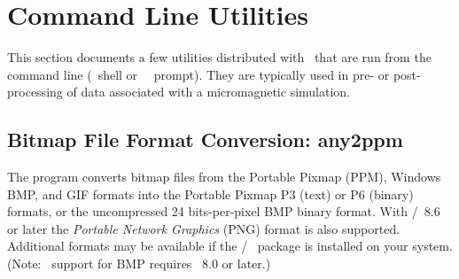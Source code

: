 \section{Command Line Utilities}\label{sec:cmdutils}

This section documents a few utilities distributed with \OOMMF\ that are
run from the command line (\Unix\ shell or \Windows\ \DOS\ prompt).
They are typically used in pre- or post-processing of data associated
with a micromagnetic simulation.


\subsection{Bitmap File Format Conversion:
          any2ppm}\label{sec:any2ppm}%
%
The  program converts bitmap files from the Portable Pixmap
(PPM), Windows BMP, and GIF formats into the Portable Pixmap P3
(text) or P6 (binary) formats, or the uncompressed 24 bits-per-pixel BMP
binary format.  With \Tcl/\Tk\ 8.6 or later
the \textit{Portable Network Graphics} (PNG) format is also
supported.  Additional formats may be available if the \Tcl/\Tk\
package is installed on your system.  (Note: \OOMMF\ support for BMP
requires \Tk\ 8.0\index{requirement!Tk~8.0+} or later.)

